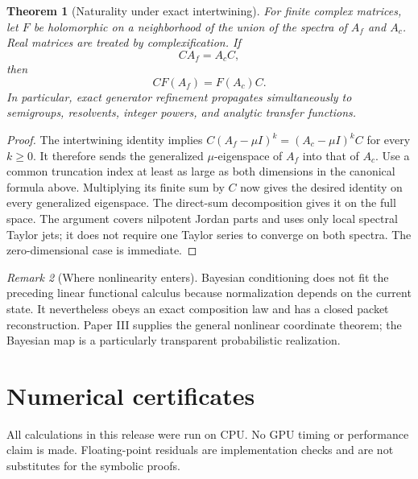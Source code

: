\documentclass[11pt,a4paper]{article}
\newtheorem{theorem}{Theorem}[section]
\theoremstyle{definition}
\theoremstyle{remark}
\newtheorem{remark}[theorem]{Remark}
\begin{document}
\begin{theorem}[Naturality under exact intertwining]\label{core:record:044}
For finite complex matrices, let $F$ be holomorphic on a neighborhood of the union of the spectra of $A_f$ and $A_c$. Real matrices are treated by complexification. If
\[
CA_f=A_cC,
\]
then
\[
\boxed{CF(A_f)=F(A_c)C.}
\]
In particular, exact generator refinement propagates simultaneously to semigroups, resolvents, integer powers, and analytic transfer functions.
\end{theorem}

\begin{proof}
The intertwining identity implies
$C(A_f-\mu I)^k=(A_c-\mu I)^kC$ for every $k\ge0$.
It therefore sends the generalized $\mu$-eigenspace of $A_f$ into that of $A_c$.
Use a common truncation index at least as large as both dimensions in the
canonical formula above. Multiplying its finite sum by $C$ now gives the desired
identity on every generalized eigenspace. The direct-sum decomposition gives
it on the full space. The argument covers nilpotent Jordan parts and uses only
local spectral Taylor jets; it does not require one Taylor series to converge
on both spectra. The zero-dimensional case is immediate.
\end{proof}

\begin{remark}[Where nonlinearity enters]\label{core:record:045}
Bayesian conditioning does not fit the preceding linear functional calculus because normalization depends on the current state. It nevertheless obeys an exact composition law and has a closed packet reconstruction. Paper III supplies the general nonlinear coordinate theorem; the Bayesian map is a particularly transparent probabilistic realization.
\end{remark}

\section{Numerical certificates}\label{core:section:16}

All calculations in this release were run on CPU. No GPU timing or performance claim is made. Floating-point residuals are implementation checks and are not substitutes for the symbolic proofs.
\end{document}
